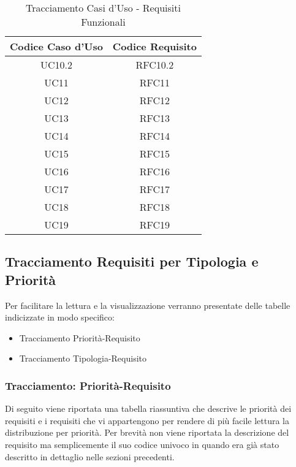         \begin{table}[!htbp] %
            \centering
            \renewcommand{\arraystretch}{2} %
                \begin{tabular}{|c|c|} %
                \rowcolor{orange!50} %
        		\hline
        		\textbf{Codice Caso d'Uso} & \textbf{Codice Requisito} \\
                \hline
                UC10.2 & RFC10.2\\
                \hline
                UC11 & RFC11\\
                \hline
                UC12 & RFC12\\
                \hline
                UC13 & RFC13\\
                \hline
                UC14 & RFC14\\
                \hline
                UC15 & RFC15\\
                \hline
                UC16 & RFC16\\
                \hline
                UC17 & RFC17\\
                \hline
                UC18 & RFC18\\
                \hline
                UC19 & RFC19\\
                \hline
        \end{tabular}
        \caption{Tracciamento Casi d'Uso - Requisiti Funzionali} %
\end{table}

\subsection{Tracciamento Requisiti per Tipologia e Priorità}
Per facilitare la lettura e la visualizzazione verranno presentate delle tabelle indicizzate in modo specifico:
\begin{itemize}
    \item Tracciamento Priorità-Requisito
    \item Tracciamento Tipologia-Requisito
\end{itemize}

\subsubsection{Tracciamento: Priorità-Requisito}
Di seguito viene riportata una tabella riassuntiva che descrive le priorità dei requisiti e i requisiti che vi appartengono per rendere di più facile lettura la distribuzione per priorità.
Per brevità non viene riportata la descrizione del requisito ma semplicemente il suo codice univoco in quando era già stato descritto in dettaglio nelle sezioni precedenti.   

